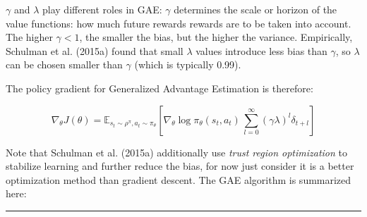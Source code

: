 \documentclass[
  letterpaper,
  DIV=11,
  numbers=noendperiod]{scrreprt}
\begin{document}
\(\gamma\) and \(\lambda\) play different roles in GAE: \(\gamma\)
determines the scale or horizon of the value functions: how much future
rewards rewards are to be taken into account. The higher \(\gamma <1\),
the smaller the bias, but the higher the variance. Empirically, Schulman
et al. (2015a) found that small \(\lambda\) values introduce less bias
than \(\gamma\), so \(\lambda\) can be chosen smaller than \(\gamma\)
(which is typically 0.99).

The policy gradient for Generalized Advantage Estimation is therefore:

\[
    \nabla_\theta J(\theta) =  \mathbb{E}_{s_t \sim \rho^\pi, a_t \sim \pi_\theta}[\nabla_\theta \log \pi_\theta (s_t, a_t) \, \sum_{l=0}^\infty (\gamma \lambda)^l \delta_{t+l} ]
\]

Note that Schulman et al. (2015a) additionally use \emph{trust region
optimization} to stabilize learning and further reduce the bias, for now
just consider it is a better optimization method than gradient descent.
The GAE algorithm is summarized here:

\begin{center}\rule{0.5\linewidth}{0.5pt}\end{center}
\end{document}
